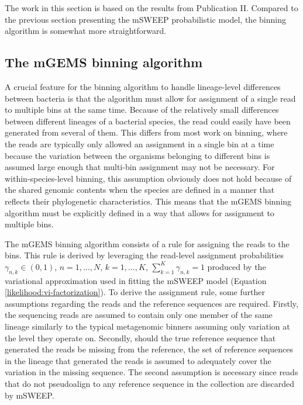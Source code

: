 \documentclass[officiallayout]{tktla}
\begin{document}
The work in this section is based on the results from Publication
II. Compared to the previous section presenting the mSWEEP
probabilistic model, the binning algorithm is somewhat more
straightforward.

\subsection{The mGEMS binning algorithm}

A crucial feature for the binning algorithm to handle lineage-level
differences between bacteria is that the algorithm must allow for
assignment of a single read to multiple bins at the same time. Because
of the relatively small differences between different lineages of a
bacterial species, the read could easily have been generated from
several of them. This differs from most work on binning, where the
reads are typically only allowed an assignment in a single bin at a
time because the variation between the organisms belonging to
different bins is assumed large enough that multi-bin assignment may
not be necessary. For within-species-level binning, this
assumption obviously does not hold because of the shared genomic
contents when the species are defined in a manner that reflects their
phylogenetic characteristics. This means that the mGEMS binning
algorithm must be explicitly defined in a way that allows for
assignment to multiple bins.

The mGEMS binning algorithm consists of a rule for assigning the reads
to the bins. This rule is derived by leveraging the read-level
assignment probabilities $\gamma_{n, k} \in \left(0, 1\right)$, $n =
1, \dots, N$, $k = 1, \dots, K$, $\sum_{k = 1}^{K}\gamma_{n, k} = 1$
produced by the variational approximation used in fitting the mSWEEP
model (Equation \eqref{likelihood:vi-factorization}). To derive the
assignment rule, some further assumptions regarding the reads and the
reference sequences are required. Firstly, the sequencing reads are
assumed to contain only one member of the same lineage \textemdash{ }
similarly to the typical metagenomic binners assuming only variation
at the level they operate on. Secondly, should the true reference
sequence that generated the reads be missing from the reference, the
set of reference sequences in the lineage that generated the reads is
assumed to adequately cover the variation in the missing sequence. The
second assumption is necessary since reads that do not pseudoalign to
any reference sequence in the collection are discarded by mSWEEP.
\end{document}
